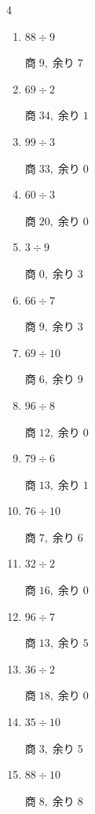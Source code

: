 \begin{multicols}{4}
\begin{enumerate}
\columnbreak %

  \item $88 \div 9$

        $商\; 9,\; 余り\; 7$

  \item $69 \div 2$

        $商\; 34,\; 余り\; 1$

  \item $99 \div 3$

        $商\; 33,\; 余り\; 0$

  \item $60 \div 3$

        $商\; 20,\; 余り\; 0$

  \item $3 \div 9$

        $商\; 0,\; 余り\; 3$

  \item $66 \div 7$

        $商\; 9,\; 余り\; 3$

  \item $69 \div 10$

        $商\; 6,\; 余り\; 9$

  \item $96 \div 8$

        $商\; 12,\; 余り\; 0$

  \item $79 \div 6$

        $商\; 13,\; 余り\; 1$

  \item $76 \div 10$

        $商\; 7,\; 余り\; 6$

  \item $32 \div 2$

        $商\; 16,\; 余り\; 0$

  \item $96 \div 7$

        $商\; 13,\; 余り\; 5$

  \item $36 \div 2$

        $商\; 18,\; 余り\; 0$

  \item $35 \div 10$

        $商\; 3,\; 余り\; 5$

  \item $88 \div 10$

        $商\; 8,\; 余り\; 8$


\end{enumerate}
\end{multicols}

